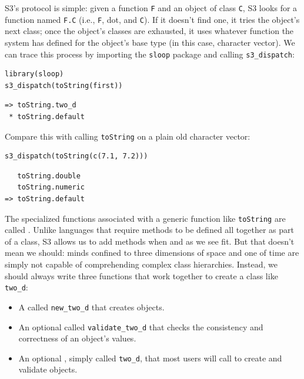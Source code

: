 S3's protocol is simple:
given a function \texttt{F} and an object of class \texttt{C},
S3 looks for a function named \texttt{F.C}
(i.e., \texttt{F}, dot, and \texttt{C}).
If it doesn't find one,
it tries the object's next class;
once the object's classes are exhausted,
it uses whatever function the system has defined for the object's base type
(in this case, character vector).
We can trace this process by importing the \texttt{sloop} package
and calling \texttt{s3\_dispatch}:

\begin{lstlisting}
library(sloop)
s3_dispatch(toString(first))
\end{lstlisting}

\begin{lstlisting}
=> toString.two_d
 * toString.default
\end{lstlisting}

\noindent
Compare this with calling \texttt{toString} on a plain old character vector:

\begin{lstlisting}
s3_dispatch(toString(c(7.1, 7.2)))
\end{lstlisting}

\begin{lstlisting}
   toString.double
   toString.numeric
=> toString.default
\end{lstlisting}

The specialized functions associated with a generic function like \texttt{toString}
are called .
Unlike languages that require methods to be defined all together as part of a class,
S3 allows us to add methods when and as we see fit.
But that doesn't mean we should:
minds confined to three dimensions of space and one of time
are simply not capable of comprehending complex class hierarchies.
Instead,
we should always write three functions that work together
to create a class like \texttt{two\_d}:

\begin{itemize}
\item
  A  called \texttt{new\_two\_d}
  that creates objects.
\item
  An optional  called \texttt{validate\_two\_d}
  that checks the consistency and correctness of an object's values.
\item
  An optional ,
  simply called \texttt{two\_d},
  that most users will call to create and validate objects.
\end{itemize}

